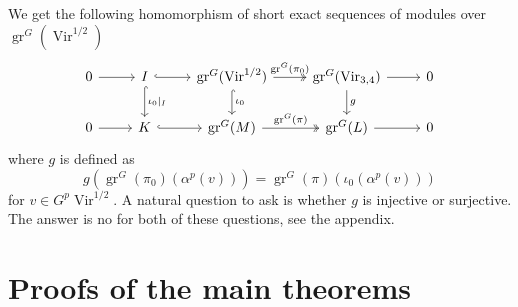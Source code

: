 \documentclass[12pt,a4paper]{article}
\DeclareMathOperator{\Vir}{Vir}
\DeclareMathOperator{\gr}{gr}
\begin{document}
We get the following homomorphism of short exact sequences of modules over $\gr^G(\Vir^{1/2})$
\begin{equation*}
  \begin{tikzcd}
    0 \arrow[r] & I \arrow[r, hook] \arrow[d, "\iota_0|_I", hook] & \gr^G(\Vir^{1/2}) \arrow[r, "\gr^G(\pi_0)", two heads] \arrow[d, "\iota_0", hook] & {\gr^G(\Vir_{3,4})} \arrow[d, "g"] \arrow[r] & 0 \\
    0 \arrow[r] & K \arrow[r, hook]                               & \gr^G(M) \arrow[r, "\gr^G(\pi)", two heads]                                      & \gr^G(L) \arrow[r]                          & 0
  \end{tikzcd}
\end{equation*}
where $g$ is defined as
\begin{equation*}
  g(\gr^G(\pi_0)(\alpha^p(v)))=\gr^G(\pi)(\iota_0(\alpha^p(v)))
\end{equation*}
for $v\in G^p\Vir^{1/2}$.
A natural question to ask is whether $g$ is injective or surjective.
The answer is no for both of these questions, see the appendix.

\section{Proofs of the main theorems}
\label{sec:proofs-main-theorems}
\end{document}
